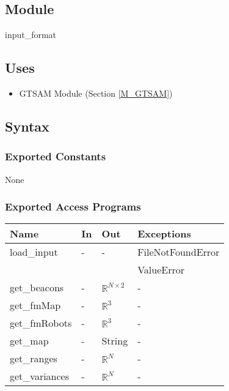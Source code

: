 \documentclass[12pt, titlepage]{article}
\begin{document}


\subsection{Module}

input\_format

\subsection{Uses}
\begin{itemize}
  \item GTSAM Module (Section \ref{M_GTSAM})
\end{itemize}

\subsection{Syntax}

\subsubsection{Exported Constants}
None
\subsubsection{Exported Access Programs}

\begin{center}
\begin{tabular}{p{3cm} p{2cm} p{2cm} p{4cm}}
\hline
\textbf{Name} & \textbf{In} & \textbf{Out} & \textbf{Exceptions} \\
\hline
load\_input & -& -& FileNotFoundError \\
 &  &  & ValueError \\
get\_beacons& - & $\mathbb{R}^{N \times 2}$ & - \\
get\_fmMap& - & $\mathbb{R}^3$ & - \\
get\_fmRobots& - & $\mathbb{R}^3$ & - \\
get\_map& - & String & - \\
get\_ranges& - & $\mathbb{R}^N$ & - \\
get\_variances& - & $\mathbb{R}^N$ & - \\
\hline
\end{tabular}
\end{center}
\end{document}
